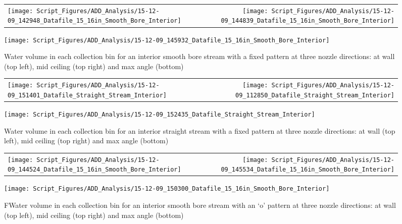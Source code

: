 \documentclass{article}
\begin{document}
\begin{figure}[ht]
\begin{tabular*}{\textwidth}{lr}
\texttt{[image: Script\_Figures/ADD\_Analysis/15-12-09\_142948\_Datafile\_15\_16in\_Smooth\_Bore\_Interior]} &
\texttt{[image: Script\_Figures/ADD\_Analysis/15-12-09\_144839\_Datafile\_15\_16in\_Smooth\_Bore\_Interior]} \\
\end{tabular*}
\centering
\texttt{[image: Script\_Figures/ADD\_Analysis/15-12-09\_145932\_Datafile\_15\_16in\_Smooth\_Bore\_Interior]}
\caption{Water volume in each collection bin for an interior smooth bore stream with a fixed pattern at three nozzle directions: at wall (top left), mid ceiling (top right) and max angle (bottom)}
\label{fig:Interior_Varying_Nozzle_Direction_SB_Fixed_Pattern}
\end{figure}

\begin{figure}[ht]
\begin{tabular*}{\textwidth}{lr}
\texttt{[image: Script\_Figures/ADD\_Analysis/15-12-09\_151401\_Datafile\_Straight\_Stream\_Interior]} &
\texttt{[image: Script\_Figures/ADD\_Analysis/15-12-09\_112850\_Datafile\_Straight\_Stream\_Interior]} \\
\end{tabular*}
\centering
\texttt{[image: Script\_Figures/ADD\_Analysis/15-12-09\_152435\_Datafile\_Straight\_Stream\_Interior]}
\caption{Water volume in each collection bin for an interior straight stream with a fixed pattern at three nozzle directions: at wall (top left), mid ceiling (top right) and max angle (bottom)}
\label{fig:Interior_Varying_Nozzle_Direction_SS_Fixed_Pattern}
\end{figure}

\begin{figure}[ht]
\begin{tabular*}{\textwidth}{lr}
\texttt{[image: Script\_Figures/ADD\_Analysis/15-12-09\_144524\_Datafile\_15\_16in\_Smooth\_Bore\_Interior]} &
\texttt{[image: Script\_Figures/ADD\_Analysis/15-12-09\_145534\_Datafile\_15\_16in\_Smooth\_Bore\_Interior]} \\
\end{tabular*}
\centering
\texttt{[image: Script\_Figures/ADD\_Analysis/15-12-09\_150300\_Datafile\_15\_16in\_Smooth\_Bore\_Interior]}
\caption{FWater volume in each collection bin for an interior smooth bore stream with an `o' pattern at three nozzle directions: at wall (top left), mid ceiling (top right) and max angle (bottom)}
\label{fig:Interior_Varying_Nozzle_Direction_SB_O_Pattern}
\end{figure}
\end{document}
